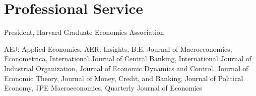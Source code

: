 \documentclass[letterpaper]{article}
\def\footerlink{http://jblevins.org/projects/cv-template/}
\begin{document}
\section*{Professional Service}
\begin{description}[labelindent=0pt, labelwidth=1in, labelsep*=1em, leftmargin =!, font=\normalfont]
\item[2020--2021] President, Harvard Graduate Economics Association
\item[Refereeing] {AEJ: Applied Economics, AER: Insights, B.E. Journal of Macroeconomics, Econometrica, International Journal of Central Banking, International Journal of Industrial Organization, Journal of Economic Dynamics and Control, Journal of Economic Theory, Journal of Money, Credit, and Banking, Journal of Political Economy, JPE Macroeconomics, Quarterly Journal of Economics}
\end{description}


\end{document}
